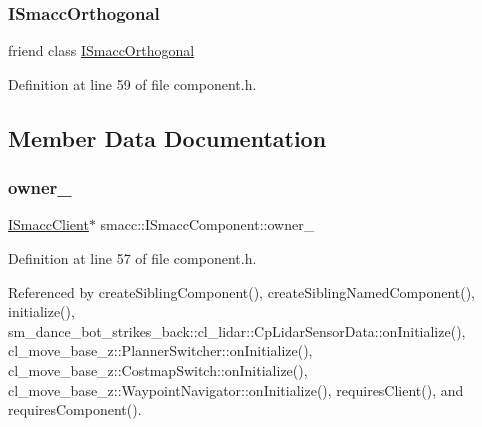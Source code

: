 \subsubsection{\texorpdfstring{I\+Smacc\+Orthogonal}{ISmaccOrthogonal}}
{\footnotesize\ttfamily friend class \hyperlink{classsmacc_1_1ISmaccOrthogonal}{I\+Smacc\+Orthogonal}\hspace{0.3cm}{\ttfamily [friend]}}



Definition at line 59 of file component.\+h.



\subsection{Member Data Documentation}
\mbox{\label{classsmacc_1_1ISmaccComponent_a909590e672450ce0eb0d8facb45c737a}} 
\subsubsection{\texorpdfstring{owner\+\_\+}{owner\_}}
{\footnotesize\ttfamily \hyperlink{classsmacc_1_1ISmaccClient}{I\+Smacc\+Client}$\ast$ smacc\+::\+I\+Smacc\+Component\+::owner\+\_\+\hspace{0.3cm}{\ttfamily [protected]}}



Definition at line 57 of file component.\+h.



Referenced by create\+Sibling\+Component(), create\+Sibling\+Named\+Component(), initialize(), sm\+\_\+dance\+\_\+bot\+\_\+strikes\+\_\+back\+::cl\+\_\+lidar\+::\+Cp\+Lidar\+Sensor\+Data\+::on\+Initialize(), cl\+\_\+move\+\_\+base\+\_\+z\+::\+Planner\+Switcher\+::on\+Initialize(), cl\+\_\+move\+\_\+base\+\_\+z\+::\+Costmap\+Switch\+::on\+Initialize(), cl\+\_\+move\+\_\+base\+\_\+z\+::\+Waypoint\+Navigator\+::on\+Initialize(), requires\+Client(), and requires\+Component().

\mbox{\label{classsmacc_1_1ISmaccComponent_ae3f37acc1679f79299b86872d4b1f80f}} 
